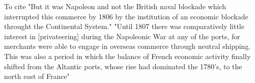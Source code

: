 \documentclass[12pt,a4paper,notitlepage,english]{article}
\begin{document}

To cite "But it was Napoleon and not the British naval blockade which interrupted this commerce by 1806 by the institution of an economic blockade throught the Continental System."\citep[p. 35]{Crowhurst1989}
"Until 1807 there was comparatively little interest in [privateering] during the Napoleonic War at any of the ports, for merchants were able to engage in overseas commerce through neutral shipping. This was also a period in which the balance of French economic activity finally shifted from the Altantic ports, whose rise had dominated the 1780’s, to the north east of France"\citep[p. 36]{Crowhurst1989}
\end{document}
